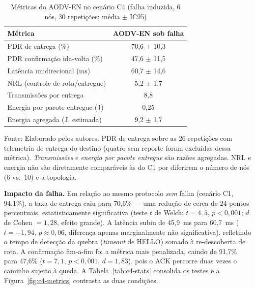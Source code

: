 \begin{table}[H]
\centering
\caption{Métricas do AODV-EN no cenário C4 (falha induzida, 6 nós, 30 repetições; média $\pm$ IC95)}\label{tab:c4}
\begin{tabular}{@{}lc@{}}
\toprule
Métrica & AODV-EN sob falha \\
\midrule
PDR de entrega (\%) & 70,6 $\pm$ 10,3 \\
PDR confirmação ida-volta (\%) & 47,6 $\pm$ 11,5 \\
Latência unidirecional (ms) & 60,7 $\pm$ 14,6 \\
NRL (controle de rota/entregue) & 5,2 $\pm$ 1,7 \\
Transmissões por entrega & 8,8 \\
Energia por pacote entregue (J) & 0,25 \\
Energia agregada (J, estimada) & 9,2 $\pm$ 1,7 \\
\bottomrule
\end{tabular}

\vspace{2pt}
{\footnotesize Fonte: Elaborado pelos autores. PDR de entrega sobre as 26 repetições com
telemetria de entrega do destino (quatro sem reporte foram excluídas dessa métrica).
\emph{Transmissões} e \emph{energia por pacote entregue} são razões agregadas. NRL e
energia não são diretamente comparáveis às do C1 por diferirem o número de nós (6 vs.~10)
e a topologia.}
\end{table}

\textbf{Impacto da falha.} Em relação ao mesmo protocolo \emph{sem} falha
(cenário C1, 94,1\%), a taxa de entrega caiu para 70,6\% --- uma redução de
cerca de 24 pontos percentuais, estatisticamente significativa (teste $t$ de
Welch: $t = 4{,}5$, $p < 0{,}001$; $d$ de Cohen $= 1{,}28$, efeito grande). A
latência subiu de 45,9~ms para 60,7~ms ($t = -1{,}94$, $p \approx 0{,}06$,
diferença apenas marginalmente não significativa),
refletindo o tempo de detecção da quebra (\emph{timeout} de HELLO) somado à
re-descoberta de rota. A confirmação fim-a-fim foi a métrica mais penalizada,
caindo de 91,7\% para 47,6\% ($t = 7{,}1$, $p < 0{,}001$, $d = 1{,}83$), pois o
ACK percorre duas vezes o caminho sujeito à queda. A
Tabela~\ref{tab:c4-stats} consolida os testes e a Figura~\ref{fig:c4-metrics}
contrasta as duas condições.

